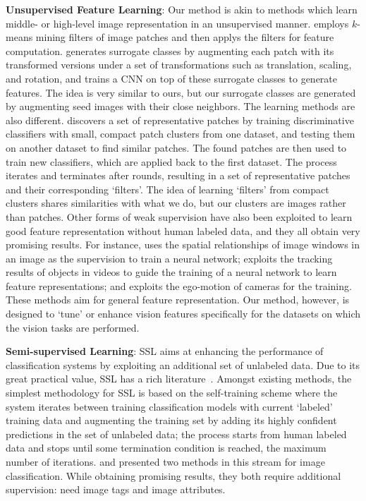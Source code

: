 \documentclass[preprint,12pt,3p]{elsarticle}
\begin{document}
\textbf{Unsupervised Feature Learning}: Our method is akin to methods which learn middle- or high-level image
representation in an unsupervised manner. \citep{stl-10} employs
$k$-means mining filters of image patches and then applys the filters
for feature computation. \citep{cnnfet14} generates surrogate classes
by augmenting each patch with its transformed versions under a set of
transformations such as translation, scaling, and rotation, and trains
a CNN on top of these surrogate classes to generate features. The idea
is very similar to ours, but our surrogate classes are generated by
augmenting seed images with their close neighbors. The learning
methods are also different. \citep{mid-level:patches} discovers a set
of representative patches by training discriminative classifiers with
small, compact patch clusters from one dataset, and testing them on
another dataset to find similar patches. The found patches are then
used to train new classifiers, which are applied back to the first
dataset. The process iterates and terminates after rounds, resulting
in a set of representative patches and their corresponding
`filters'. The idea of learning `filters' from compact clusters shares
similarities with what we do, but our clusters are images rather than
patches. Other forms of weak supervision have also been exploited to learn good 
feature representation without human labeled data, and they all obtain very promising results. 
For instance, \citep{feature:context} uses the spatial relationships of 
image windows in an image as the supervision to train a neural network; \citep{feature:video} exploits 
the tracking results of objects in videos to guide the training of a neural network to learn 
feature representations; and \citep{learning:by:moving} exploits the ego-motion of cameras for the training.
These methods aim for general feature representation. Our method, however, is designed to 
`tune' or enhance vision features specifically for the datasets on which the vision tasks are performed.  

\textbf{Semi-supervised Learning}: SSL aims at enhancing the
performance of classification systems by exploiting an additional set of
unlabeled data. Due to its great practical value, SSL has a rich
literature~\citep{book06:ssl, Zhu:ISL:2009}. Amongst existing methods,
the simplest methodology for SSL is based on the self-training scheme
\citep{co-training:98} where the system iterates between training
classification models with current `labeled' training data and augmenting
the training set by adding its highly confident predictions in the set
of unlabeled data; the process starts from human labeled data and
stops until some termination condition is reached, \eg the maximum
number of iterations.  \citep{Guillaumin:cvpr:10} and \citep{Semi:eccv12} presented two methods in this stream for image classification. While
obtaining promising results, they both require additional supervision:
\citep{Guillaumin:cvpr:10} need image tags and \citep{Semi:eccv12}
image attributes.
\end{document}
